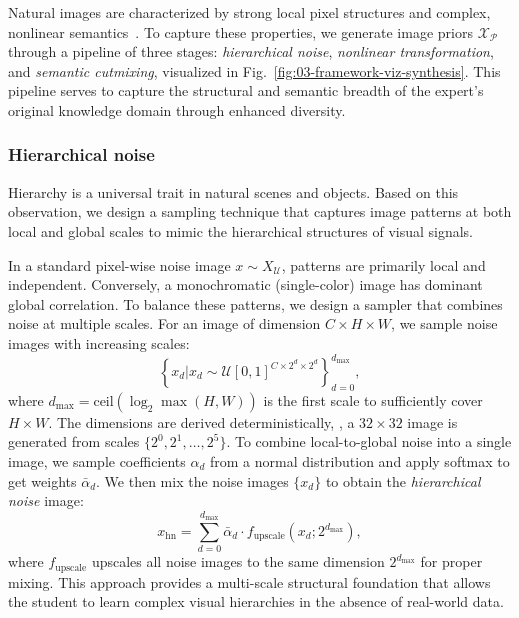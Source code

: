 \begin{foldable} %
  Natural images are characterized by strong local pixel structures and complex, nonlinear semantics~\cite{lecun2002gradient}.
  To capture these properties, we generate image priors $\mathcal{X}_\mathcal{P}$ through a pipeline of three stages: \textit{hierarchical noise}, \textit{nonlinear transformation}, and \textit{semantic cutmixing}, visualized in Fig.~\ref{fig:03-framework-viz-synthesis}.
  This pipeline serves to capture the structural and semantic breadth of the expert's original knowledge domain through enhanced diversity.
\end{foldable}

\subsubsection{Hierarchical noise} \label{sssec:03-framework-synthesis-hiernoise}
\begin{foldable} %
  Hierarchy is a universal trait in natural scenes and objects.
  Based on this observation, we design a sampling technique that captures image patterns at both local and global scales to mimic the hierarchical structures of visual signals.
\end{foldable}

\begin{foldable} %
  In a standard pixel-wise noise image $x \sim X_\mathcal{U}$, patterns are primarily local and independent.
  Conversely, a monochromatic (single-color) image has dominant global correlation.
  To balance these patterns, we design a sampler that combines noise at multiple scales.
  For an image of dimension $C \times H \times W$, we sample noise images with increasing scales:
  \begin{equation} \label{eq:synthesis-hiernoise-multiscale}
    \left\{ x_{d} |x_{d} \sim \mathcal{U}[0,1]^{C\times2^{d}\times2^{d}} \right\}_{d=0}^{d_\text{max}},
  \end{equation}
  where $d_\text{max} = \text{ceil}(\log_{2} \max(H, W))$ is the first scale to sufficiently cover $H\times W$.
  The dimensions are derived deterministically, \eg, a $32 \times 32$ image is generated from scales $\{2^0, 2^1, \ldots, 2^5\}$.
  To combine local-to-global noise into a single image, we sample coefficients $\alpha_d$ from a normal distribution and apply softmax to get weights $\bar{\alpha}_{d}$.
  We then mix the noise images $\{x_d\}$ to obtain the \textit{hierarchical noise} image:
  \begin{equation} \label{eq:synthesis-hiernoise-combine}
    x_\text{hn} = \sum_{d=0}^{d_\text{max}} \bar{\alpha}_{d} \cdot f_\text{upscale}\left(x_{d};2^{d_\text{max}}\right),
  \end{equation}
  where $f_\text{upscale}$ upscales all noise images to the same dimension $2^{d_\text{max}}$ for proper mixing.
  This approach provides a multi-scale structural foundation that allows the student to learn complex visual hierarchies in the absence of real-world data.
\end{foldable}

